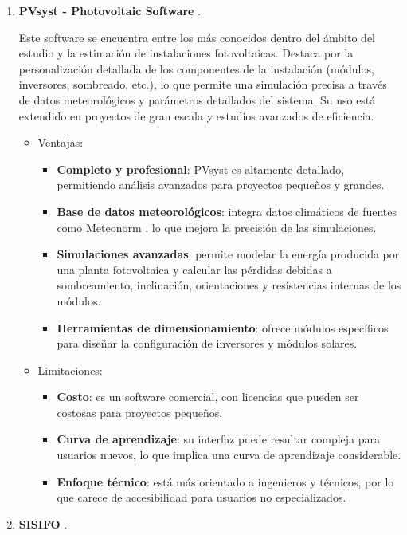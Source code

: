 \begin{enumerate}
\item \textbf{PVsyst - Photovoltaic Software} \cite{pvsyst}.

Este software se encuentra entre los más conocidos dentro del ámbito del estudio y la estimación de instalaciones fotovoltaicas. Destaca por la personalización detallada de los componentes de la instalación (módulos, inversores, sombreado, etc.), lo que permite una simulación precisa a través de datos meteorológicos y parámetros detallados del sistema. Su uso está extendido en proyectos de gran escala y estudios avanzados de eficiencia.
\begin{itemize}
\item Ventajas:
\begin{itemize}
\item \textbf{Completo y profesional}: PVsyst es altamente detallado, permitiendo análisis avanzados para proyectos pequeños y grandes.
\item \textbf{Base de datos meteorológicos}: integra datos climáticos de fuentes como Meteonorm \cite{jan20}, lo que mejora la precisión de las simulaciones.
\item \textbf{Simulaciones avanzadas}: permite modelar la energía producida por una planta fotovoltaica y calcular las pérdidas debidas a sombreamiento, inclinación, orientaciones y resistencias internas de los módulos.
\item \textbf{Herramientas de dimensionamiento}: ofrece módulos específicos para diseñar la configuración de inversores y módulos solares.
\end{itemize}
\item Limitaciones:
\begin{itemize}
\item \textbf{Costo}: es un software comercial, con licencias que pueden ser costosas para proyectos pequeños.
\item \textbf{Curva de aprendizaje}: su interfaz puede resultar compleja para usuarios nuevos, lo que implica una curva de aprendizaje considerable.
\item \textbf{Enfoque técnico}: está más orientado a ingenieros y técnicos, por lo que carece de accesibilidad para usuarios no especializados.
\end{itemize}
\end{itemize}
\item \textbf{SISIFO} \cite{sisifo}.


\end{enumerate}
